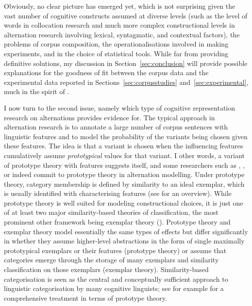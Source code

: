 Obviously, no clear picture has emerged yet, which is not surprising given the vast number of cognitive constructs assumed at diverse levels (such as the level of words in collocation research and much more complex constructional levels in alternation research involving lexical, syntagmatic, and contextual factors), the problems of corpus composition, the operationalisations involved in making experiments, and in the choice of statistical tools.
While far from providing definitive solutions, my discussion in Section~\ref{sec:conclusion} will provide possible explanations for the goodness of fit between the corpus data and the experimental data reported in Sections~\ref{sec:corpusstudies} and~\ref{sec:experimental}, much in the spirit of \citet{Dabrowska2014}.

I now turn to the second issue, namely which type of cognitive representation research on alternations provides evidence for.
The typical approach in alternation research is to annotate a large number of corpus sentences with linguistic features and to model the probability of the variants being chosen given these features.
The idea is that a variant is chosen when the influencing features cumulatively assume \textit{prototypical} values for that variant.
I other words, a variant of prototype theory with features \citep{Rosch1978} suggests itself, and some researchers such as \cite{Gries2003}, \cite{NessetJanda2010}, or \cite{Schaefer2016c} indeed commit to prototype theory in alternation modelling.
Under prototype theory, category membership is defined by similarity to an ideal exemplar, which is usually identified with characterising features (see \citealp{Taylor2008} for an overview).
While prototype theory is well suited for modeling constructional choices, it is just one of at least two major similarity-based theories of classification, the most prominent other framework being exemplar theory (\citealp{MedinSchaffer1978,Hintzman1986}).
Prototype theory and exemplar theory model essentially the same types of effects but differ significantly in whether they assume higher-level abstractions in the form of single maximally prototypical exemplars or their features (prototype theory) or assume that categories emerge through the storage of many exemplars and similarity classification on those exemplars (exemplar theory).
Similarity-based categorisation is seen as the central and conceptually sufficient approach to linguistic categorisation by many cognitive linguists; see for example \cite{Taylor2003} for a comprehensive treatment in terms of prototype theory.
